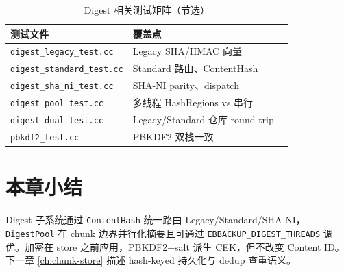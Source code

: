 \begin{table}[htbp]
\centering
\caption{Digest 相关测试矩阵（节选）}
\begin{tabular}{@{}llp{7cm}@{}}
\toprule
测试文件 & 覆盖点 \\
\midrule
\texttt{digest\_legacy\_test.cc} & Legacy SHA/HMAC 向量 \\
\texttt{digest\_standard\_test.cc} & Standard 路由、ContentHash \\
\texttt{digest\_sha\_ni\_test.cc} & SHA-NI parity、dispatch \\
\texttt{digest\_pool\_test.cc} & 多线程 HashRegions vs 串行 \\
\texttt{digest\_dual\_test.cc} & Legacy/Standard 仓库 round-trip \\
\texttt{pbkdf2\_test.cc} & PBKDF2 双栈一致 \\
\bottomrule
\end{tabular}
\end{table}

\section{本章小结}

Digest 子系统通过 \texttt{ContentHash} 统一路由 Legacy/Standard/SHA-NI，\texttt{DigestPool} 在 chunk 边界并行化摘要且可通过 \texttt{EBBACKUP\_DIGEST\_THREADS} 调优。加密在 store 之前应用，PBKDF2+salt 派生 CEK，但不改变 Content ID。下一章 \cref{ch:chunk-store} 描述 hash-keyed 持久化与 dedup 查重语义。
